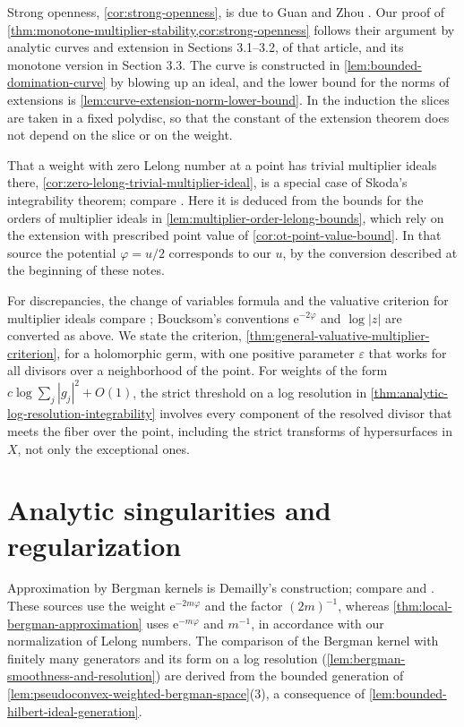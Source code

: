 Strong openness, \cref{cor:strong-openness}, is due to Guan and Zhou \cite{GZ15Strong}. Our proof of \cref{thm:monotone-multiplier-stability,cor:strong-openness} follows their argument by analytic curves and extension in Sections 3.1--3.2, of that article, and its monotone version in Section 3.3. The curve is constructed in \cref{lem:bounded-domination-curve} by blowing up an ideal, and the lower bound for the norms of extensions is \cref{lem:curve-extension-norm-lower-bound}. In the induction the slices are taken in a fixed polydisc, so that the constant of the extension theorem does not depend on the slice or on the weight.

That a weight with zero Lelong number at a point has trivial multiplier ideals there, \cref{cor:zero-lelong-trivial-multiplier-ideal}, is a special case of Skoda's integrability theorem; compare \cite[Lemma 5.6(a)]{DemAnalyticOnline}. Here it is deduced from the bounds for the orders of multiplier ideals in \cref{lem:multiplier-order-lelong-bounds}, which rely on the extension with prescribed point value of \cref{cor:ot-point-value-bound}. In that source the potential $\varphi=u/2$ corresponds to our $u$, by the conversion described at the beginning of these notes.

For discrepancies, the change of variables formula and the valuative criterion for multiplier ideals compare \cite[Proposition 10.12, Theorem 10.13 and Corollary 10.18]{Bou23Notes}; Boucksom's conventions $\mathrm e^{-2\varphi}$ and $\log|z|$ are converted as above. We state the criterion, \cref{thm:general-valuative-multiplier-criterion}, for a holomorphic germ, with one positive parameter $\varepsilon$ that works for all divisors over a neighborhood of the point. For weights of the form $c\log\sum_j|g_j|^2+O(1)$, the strict threshold on a log resolution in \cref{thm:analytic-log-resolution-integrability} involves every component of the resolved divisor that meets the fiber over the point, including the strict transforms of hypersurfaces in $X$, not only the exceptional ones.

\section{Analytic singularities and regularization}
\label{sec:history-analytic-regularization}
Approximation by Bergman kernels is Demailly's construction; compare \cite[Proposition 3.1 and its proof]{DemRegOnline} and \cite[Theorem 14.2]{DemAnalyticOnline}. These sources use the weight $\mathrm e^{-2m\varphi}$ and the factor $(2m)^{-1}$, whereas \cref{thm:local-bergman-approximation} uses $\mathrm e^{-m\varphi}$ and $m^{-1}$, in accordance with our normalization of Lelong numbers. The comparison of the Bergman kernel with finitely many generators and its form on a log resolution (\cref{lem:bergman-smoothness-and-resolution}) are derived from the bounded generation of \cref{lem:pseudoconvex-weighted-bergman-space}(3), a consequence of \cref{lem:bounded-hilbert-ideal-generation}.

